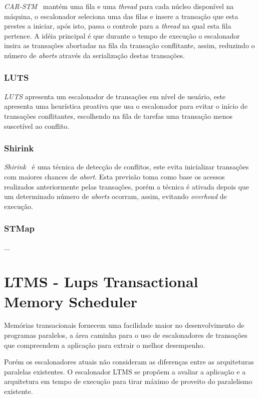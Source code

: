 \documentclass[diss,capa]{texufpel}
\begin{document}
\emph{CAR-STM}~\cite{carstm2008} mantém uma fila e uma \emph{thread} para cada núcleo disponível na máquina, o escalonador seleciona uma das filas e insere a transação que esta prestes a iniciar, após isto, passa o controle para a \emph{thread} na qual esta fila pertence. A idéia principal é que durante o tempo de execução o escalonador insira as transações abortadas na fila da transação conflitante, assim, reduzindo o número de \emph{aborts} através da serialização destas transações.

\subsection{LUTS}

\emph{LUTS} apresenta um escalonador de transações em nível de usuário, este apresenta uma heurística proativa que usa o escalonador para evitar o início de transações conflitantes, escolhendo na fila de tarefas uma transação menos suscetível ao conflito.

\subsection{Shirink}

\emph{Shirink}~\cite{shirink2009} é uma técnica de detecção de conflitos, este evita inicializar transações com maiores chances de \emph{abort}. Esta previsão toma como base os acessos realizados anteriormente pelas transações, porém a técnica é ativada depois que um determinado número de \emph{aborts} ocorram, assim, evitando \emph{overhead} de execução.

\subsection{STMap}

...

\chapter{LTMS - Lups Transactional Memory Scheduler}
\label{chapter::ltms}

Memórias transacionais fornecem uma facilidade maior no desenvolvimento de programas paralelos, a área caminha para o uso de escalonadores de transações que compreendem a aplicação para extrair o melhor desempenho.

Porém os escalonadores atuais não consideram as diferenças entre as arquiteturas paralelas existentes. O escalonador LTMS se propõem a avaliar a aplicação e a arquitetura em tempo de execução para tirar máximo de proveito do paralelismo existente.
\end{document}
